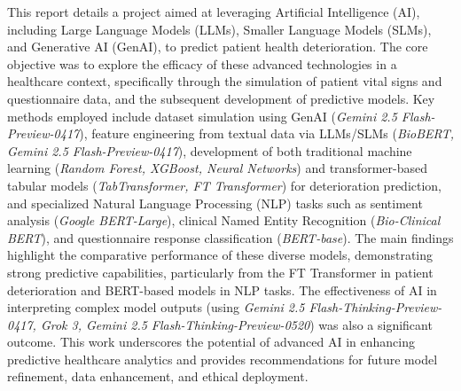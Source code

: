 This report details a project aimed at leveraging Artificial Intelligence (AI), including Large Language Models (LLMs), Smaller Language Models (SLMs), and Generative AI (GenAI), to predict patient health deterioration. The core objective was to explore the efficacy of these advanced technologies in a healthcare context, specifically through the simulation of patient vital signs and questionnaire data, and the subsequent development of predictive models. Key methods employed include dataset simulation using GenAI (\textit{Gemini 2.5 Flash-Preview-0417}), feature engineering from textual data via LLMs/SLMs (\textit{BioBERT, Gemini 2.5 Flash-Preview-0417}), development of both traditional machine learning (\textit{Random Forest, XGBoost, Neural Networks}) and transformer-based tabular models (\textit{TabTransformer, FT Transformer}) for deterioration prediction, and specialized Natural Language Processing (NLP) tasks such as sentiment analysis (\textit{Google BERT-Large}), clinical Named Entity Recognition (\textit{Bio-Clinical BERT}), and questionnaire response classification (\textit{BERT-base}). The main findings highlight the comparative performance of these diverse models, demonstrating strong predictive capabilities, particularly from the FT Transformer in patient deterioration and BERT-based models in NLP tasks. The effectiveness of AI in interpreting complex model outputs (using \textit{Gemini 2.5 Flash-Thinking-Preview-0417, Grok 3, Gemini 2.5 Flash-Thinking-Preview-0520}) was also a significant outcome. This work underscores the potential of advanced AI in enhancing predictive healthcare analytics and provides recommendations for future model refinement, data enhancement, and ethical deployment.